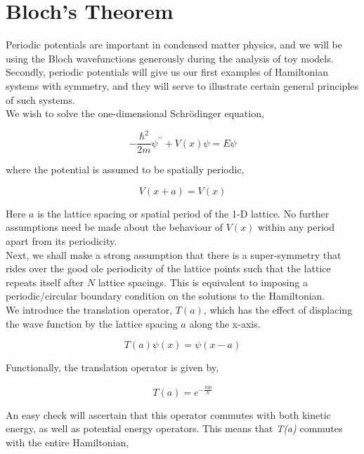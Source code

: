 \chapter{Bloch's Theorem}

Periodic potentials are important in condensed matter physics, and we will be using the Bloch wavefunctions generously during the analysis of toy models. Secondly, periodic potentials will give us our first examples of Hamiltonian systems with symmetry, and they will serve to illustrate certain general principles of such systems. \\

We wish to solve the one-dimensional Schrödinger equation,

\begin{equation*}
    -\frac{\hbar^{2}}{2m}\psi^{\prime \prime} + V(x) \psi = E \psi
\end{equation*}

where the potential is assumed to be spatially periodic,

\begin{equation}
    V(x+a) = V(x)
\end{equation}

Here $a$ is the lattice spacing or spatial period of the 1-D lattice. No further assumptions need be made about the behaviour of $V(x)$ within any period apart from its periodicity. \\

Next, we shall make a strong assumption that there is a super-symmetry that rides over the good ole periodicity of the lattice points such that the lattice repeats itself after $N$ lattice spacings. This is equivalent to imposing a periodic/circular boundary condition on the solutions to the Hamiltonian. \\

We introduce the translation operator, $T(a)$, which has the effect of displacing the wave function by the lattice spacing $a$ along the x-axis. 

\begin{equation}
    T(a) \psi(x) = \psi (x-a)
\end{equation}

Functionally, the translation operator is given by,

\begin{equation}
    T(a) = e^{-\frac{iap}{\hbar}}
\end{equation}

An easy check will ascertain that this operator commutes with both kinetic energy, as well as potential energy operators. This means that \textit{T(a)} commutes with the entire Hamiltonian, 

